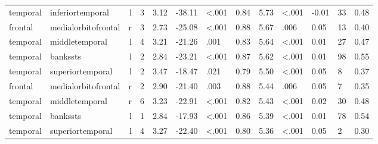\documentclass{article}
\begin{document}
\begin{longtable}{llrR{1.3cm}R{1cm}R{1.3cm}R{1cm}R{1cm}R{1.3cm}R{1cm}R{1.8cm}R{1.3cm}R{1.8cm}}
  temporal &          inferiortemporal &    l &         3 &                  3.12 &           -38.11 &      \textless.001 &                               0.84 &                          5.73 &                   \textless.001 &  -0.01 &     33 &      0.48 \\
   frontal &       medialorbitofrontal &    r &         3 &                  2.73 &           -25.08 &      \textless.001 &                               0.88 &                          5.67 &                            .006 &   0.05 &     13 &      0.40 \\
  temporal &            middletemporal &    l &         4 &                  3.21 &           -21.26 &               .001 &                               0.83 &                          5.64 &                   \textless.001 &   0.01 &     27 &      0.47 \\
  temporal &                  bankssts &    l &         2 &                  2.84 &           -23.21 &      \textless.001 &                               0.87 &                          5.62 &                   \textless.001 &   0.01 &     98 &      0.55 \\
  temporal &          superiortemporal &    l &         2 &                  3.47 &           -18.47 &               .021 &                               0.79 &                          5.50 &                   \textless.001 &   0.05 &      8 &      0.37 \\
   frontal &       medialorbitofrontal &    r &         2 &                  2.90 &           -21.40 &               .003 &                               0.88 &                          5.44 &                            .006 &   0.05 &      7 &      0.35 \\
  temporal &            middletemporal &    r &         6 &                  3.23 &           -22.91 &      \textless.001 &                               0.82 &                          5.43 &                   \textless.001 &   0.02 &     30 &      0.48 \\
  temporal &                  bankssts &    l &         1 &                  2.84 &           -17.93 &      \textless.001 &                               0.86 &                          5.39 &                   \textless.001 &   0.01 &     78 &      0.54 \\
  temporal &          superiortemporal &    l &         4 &                  3.27 &           -22.40 &      \textless.001 &                               0.80 &                          5.36 &                   \textless.001 &   0.05 &      2 &      0.30 \\

\end{longtable}
\end{document}
